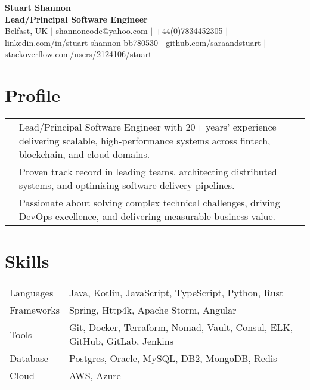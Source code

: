 \documentclass[2pt,a4paper]{article}
\newlength{\datecolumn}
\newlength{\textcolumn}
\begin{document}
\begin{center}
    {\LARGE \textbf{Stuart Shannon}} \\
    {\normalsize \textbf{Lead/Principal Software Engineer}} \\
    \vspace{0.2cm}
    Belfast, UK \quad \(|\) \quad shannoncode@yahoo.com \quad \(|\) \quad +44(0)7834452305 \quad \(|\) \quad linkedin.com/in/stuart-shannon-bb780530 \quad \(|\) \quad github.com/saraandstuart \quad \(|\) \quad stackoverflow.com/users/2124106/stuart 
\end{center}

\section*{Profile}
\begin{tabular}{p{\datecolumn} p{\textcolumn}}
& Lead/Principal Software Engineer with 20+ years’ experience delivering scalable, high-performance systems across fintech, blockchain, and cloud domains. \\
& Proven track record in leading teams, architecting distributed systems, and optimising software delivery pipelines. \\
& Passionate about solving complex technical challenges, driving DevOps excellence, and delivering measurable business value. \\
\end{tabular}

\section*{Skills}
\begin{tabular}{p{\datecolumn} p{\textcolumn}}
Languages  & Java, Kotlin, JavaScript, TypeScript, Python, Rust \\
Frameworks & Spring, Http4k, Apache Storm, Angular \\
Tools      & Git, Docker, Terraform, Nomad, Vault, Consul, ELK, GitHub, GitLab, Jenkins \\
Database   & Postgres, Oracle, MySQL, DB2, MongoDB, Redis \\
Cloud      & AWS, Azure \\
\end{tabular}
\end{document}
